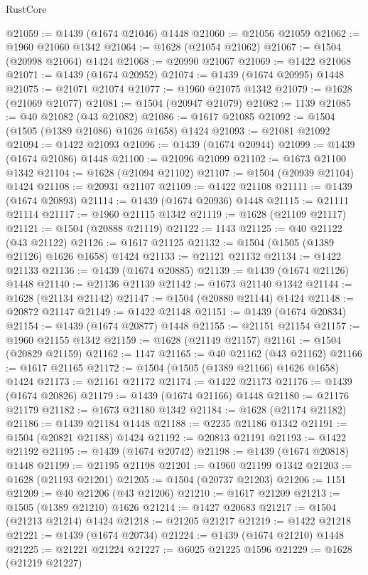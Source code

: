 \begin{lexlean}{RustCore}
\begin{coremodule}
@21059 := @1439 (@1674 @21046) @1448
@21060 := @21056 @21059
@21062 := @1960 @21060 @1342
@21064 := @1628 (@21054 @21062)
@21067 := @1504 (@20998 @21064) @1424
@21068 := @20990 @21067
@21069 := @1422 @21068
@21071 := @1439 (@1674 @20952)
@21074 := @1439 (@1674 @20995) @1448
@21075 := @21071 @21074
@21077 := @1960 @21075 @1342
@21079 := @1628 (@21069 @21077)
@21081 := @1504 (@20947 @21079)
@21082 := 1139
@21085 := @40 @21082 (@43 @21082)
@21086 := @1617 @21085
@21092 := @1504 (@1505 (@1389 @21086) @1626 @1658) @1424
@21093 := @21081 @21092
@21094 := @1422 @21093
@21096 := @1439 (@1674 @20944)
@21099 := @1439 (@1674 @21086) @1448
@21100 := @21096 @21099
@21102 := @1673 @21100 @1342
@21104 := @1628 (@21094 @21102)
@21107 := @1504 (@20939 @21104) @1424
@21108 := @20931 @21107
@21109 := @1422 @21108
@21111 := @1439 (@1674 @20893)
@21114 := @1439 (@1674 @20936) @1448
@21115 := @21111 @21114
@21117 := @1960 @21115 @1342
@21119 := @1628 (@21109 @21117)
@21121 := @1504 (@20888 @21119)
@21122 := 1143
@21125 := @40 @21122 (@43 @21122)
@21126 := @1617 @21125
@21132 := @1504 (@1505 (@1389 @21126) @1626 @1658) @1424
@21133 := @21121 @21132
@21134 := @1422 @21133
@21136 := @1439 (@1674 @20885)
@21139 := @1439 (@1674 @21126) @1448
@21140 := @21136 @21139
@21142 := @1673 @21140 @1342
@21144 := @1628 (@21134 @21142)
@21147 := @1504 (@20880 @21144) @1424
@21148 := @20872 @21147
@21149 := @1422 @21148
@21151 := @1439 (@1674 @20834)
@21154 := @1439 (@1674 @20877) @1448
@21155 := @21151 @21154
@21157 := @1960 @21155 @1342
@21159 := @1628 (@21149 @21157)
@21161 := @1504 (@20829 @21159)
@21162 := 1147
@21165 := @40 @21162 (@43 @21162)
@21166 := @1617 @21165
@21172 := @1504 (@1505 (@1389 @21166) @1626 @1658) @1424
@21173 := @21161 @21172
@21174 := @1422 @21173
@21176 := @1439 (@1674 @20826)
@21179 := @1439 (@1674 @21166) @1448
@21180 := @21176 @21179
@21182 := @1673 @21180 @1342
@21184 := @1628 (@21174 @21182)
@21186 := @1439 @21184 @1448
@21188 := @2235 @21186 @1342
@21191 := @1504 (@20821 @21188) @1424
@21192 := @20813 @21191
@21193 := @1422 @21192
@21195 := @1439 (@1674 @20742)
@21198 := @1439 (@1674 @20818) @1448
@21199 := @21195 @21198
@21201 := @1960 @21199 @1342
@21203 := @1628 (@21193 @21201)
@21205 := @1504 (@20737 @21203)
@21206 := 1151
@21209 := @40 @21206 (@43 @21206)
@21210 := @1617 @21209
@21213 := @1505 (@1389 @21210) @1626
@21214 := @1427 @20683
@21217 := @1504 (@21213 @21214) @1424
@21218 := @21205 @21217
@21219 := @1422 @21218
@21221 := @1439 (@1674 @20734)
@21224 := @1439 (@1674 @21210) @1448
@21225 := @21221 @21224
@21227 := @6025 @21225 @1596
@21229 := @1628 (@21219 @21227)

\end{coremodule}
\end{lexlean}
